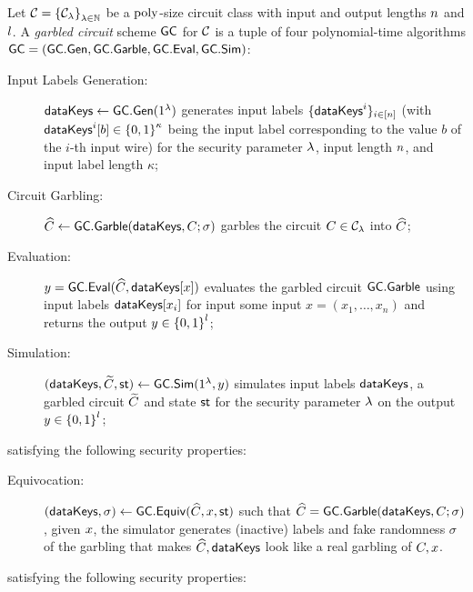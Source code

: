 \begin{mydefinition}
  Let $\mathcal{C} = {\{\mathcal{C}_\lambda\}}_{\lambda \in \mathbb{N}}$ be a
  $\text{poly}$-size circuit class with input and output lengths $n$
  and $l$.  A \emph{garbled circuit} scheme $\mathsf{GC}$ for
  $\mathcal{C}$ %
  is a tuple of four
  polynomial-time algorithms $\mathsf{GC}=(\mathsf{GC.Gen},\mathsf{GC.Garble},\mathsf{GC.Eval},\allowbreak\mathsf{GC.Sim})$: 
  \begin{description}
  \item[Input Labels Generation:] $\mathsf{dataKeys} \gets \mathsf{GC.Gen}(1^\lambda)$
    generates input labels $\{\mathsf{dataKeys}^i\}_{i \in
      [n] }$ (with $\mathsf{dataKeys}^i[b] \in {\{0,1\}}^\kappa$ being
    the input label corresponding to the value $b$ of the $i$-th input
    wire) for the security parameter $\lambda$, input length
    $n$, and input label length $\kappa$; %
  \item[Circuit Garbling:] $\widehat{C} \gets \mathsf{GC.Garble}(\mathsf{dataKeys}, C;\sigma)$
     garbles the circuit $C \in \mathcal{C}_\lambda$
    into $\widehat{C}$;
  \item[Evaluation:] $y = \mathsf{GC.Eval}(\widehat{C}, \mathsf{dataKeys}[x])$  evaluates the
    garbled circuit $\mathsf{GC.Garble}$ using input labels
    ${\mathsf{dataKeys}[{x_i}]}$ for input some input $x=(x_1,\ldots,x_n)$
    and returns the output $y \in {\{0,1\}}^l$; %
    
  \item[Simulation:] $(\mathsf{dataKeys}, \widetilde{C},\mathsf{st}) \gets \mathsf{GC.Sim}(1^\lambda,
    y)$
     simulates  input labels $\mathsf{dataKeys}$, a garbled circuit $\widetilde{C}$ and state $\mathsf{st}$ for the security parameter
    $\lambda$ on the output $y \in {\{0,1\}}^l$;
  \end{description}
  satisfying the following security properties:
  \begin{description}
  
  
  
   \item[Equivocation:] $( \mathsf{dataKeys},\sigma) \gets \mathsf{GC.Equiv}( 
    \widehat{C},x, \mathsf{st})$ such that $\widehat{C} = \mathsf{GC.Garble}(\mathsf{dataKeys}, C;\sigma)$, given
$x$, the simulator generates (inactive) labels and fake randomness $\sigma$ of the garbling that makes $\widehat{C},\mathsf{dataKeys}$ look like a real garbling
of $C, x$.
   
  \end{description}
  satisfying the following security properties:
  \begin{description}
  

\end{description}
\end{mydefinition}
